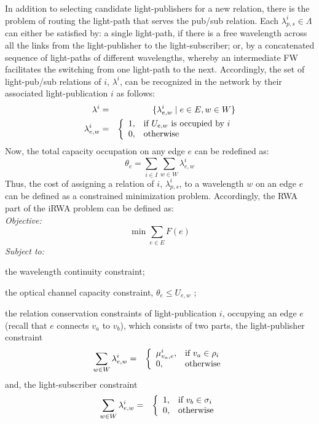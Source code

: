 \documentclass[journal]{IEEEtran}
\begin{document}
In addition to selecting candidate light-publishers for a new
relation, there is the problem of routing the light-path that serves the pub/sub relation. Each $\lambda_{p,s}^i \in \Lambda$ can either be satisfied by: a single light-path, if there is a free wavelength across all the links from the light-publisher to the light-subscriber; or, by a concatenated sequence of light-paths of different wavelengths, whereby an intermediate FW facilitates the switching from one light-path to the next. Accordingly, the set of light-pub/sub relations of $i$, $\lambda^i$, can be recognized in the network by their associated light-publication $i$ as follows:
\begin{eqnarray}
\lambda^i & = & \{\lambda_{e,w}^i \mid e \in E, w \in W \}
\\
\lambda_{e,w} ^i & = & \left\{
 \begin{array}{l l}
  1, & \textrm{if } U_{e,w} \textrm{ is occupied by } i\\
  0, & \textrm{otherwise}
 \end{array} \right.
\end{eqnarray}
Now, the total capacity occupation on any edge $e$ can be redefined as:
\begin{equation}
\theta_e = \sum_{i \in I}\sum_{w \in W }\lambda_{e,w} ^i
\end{equation}
Thus, the cost of assigning a relation of $i$, $\lambda^i_{p,s}$, to a wavelength $w$ on an edge $e$ can be defined as a constrained minimization problem. Accordingly, the RWA part of the iRWA problem can be defined as:\\
\emph{Objective:}
\begin{equation}
\min \sum_{e \in E} F(e)
\end{equation}
\emph{Subject to:}
\begin{inparaenum}
	\item the wavelength continuity constraint;
	\item the optical channel capacity constraint, $\theta_e \leq
          U_{e,w}$ ;
	\item the relation conservation constraints of
          light-publication $i$, occupying an edge $e$ (recall that
          $e$ connects $v_a$ to $v_b$), which consists of two
          parts, the light-publisher constraint
		\begin{eqnarray}
		\sum_{w \in W} \lambda_{e,w}^i & =& \left\{
		\begin{array}{l l}
		\mu^i_{v_a,e}, & \textrm{if } v_a \in \rho_i\label{eq:icnflow}\\
		0, & \textrm{otherwise}
		\end{array} \right.
		\end{eqnarray}
		and, the light-subscriber constraint
		\begin{eqnarray}
		\sum_{w \in W} \lambda_{e,w}^i & =& \left\{
		\begin{array}{l l}
		1, & \textrm{if } v_b \in \sigma_i\\
		0, & \textrm{otherwise}
		\end{array} \right.
		\end{eqnarray}
\end{inparaenum}
\end{document}
